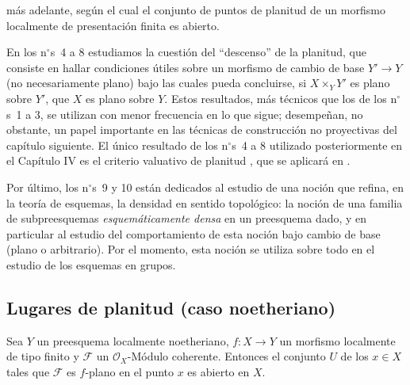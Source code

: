 más adelante, según el cual el conjunto de puntos de planitud de un morfismo
localmente de presentación finita es abierto.

En los n$^\circ$s~4 a 8 estudiamos la cuestión del ``descenso'' de la
planitud, que consiste en hallar condiciones útiles sobre un morfismo de cambio
de base $Y'\to Y$ (no necesariamente plano) bajo las cuales pueda concluirse,
si $X\times_YY'$ es plano sobre $Y'$, que $X$ es plano sobre $Y$. Estos resultados,
más técnicos que los de los n$^\circ$s~1 a 3, se utilizan con menor frecuencia
en lo que sigue; desempeñan, no obstante, un papel importante en las técnicas de
construcción no proyectivas del capítulo siguiente. El único resultado de los
n$^\circ$s~4 a 8 utilizado posteriormente en el Capítulo IV es el criterio valuativo
de planitud , que se aplicará en .

Por último, los n$^\circ$s~9 y 10 están dedicados al estudio de una noción que
refina, en la teoría de esquemas, la densidad en sentido topológico: la noción de
una familia de subpreesquemas \emph{esquemáticamente densa} en un preesquema dado,
y en particular al estudio del comportamiento de esta noción bajo cambio de base
(plano o arbitrario). Por el momento, esta noción se utiliza sobre todo en el
estudio de los esquemas en grupos.


\subsection{Lugares de planitud (caso noetheriano)}
\label{subsection:IV.11.1}

\begin{theorem}[11.1.1]
\label{IV.11.1.1}
Sea $Y$ un preesquema localmente noetheriano, $f:X\to Y$ un morfismo localmente de tipo finito y $\mathcal F$ un $\mathcal O_X$-Módulo coherente. Entonces el conjunto $U$ de los $x\in X$ tales que $\mathcal F$ es $f$-plano en el punto $x$ es abierto en $X$.
\end{theorem}

